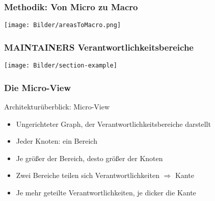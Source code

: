 \documentclass{beamer}
\begin{document}





	\begin{frame}
	\frametitle{Methodik: Von Micro zu Macro}
	\centering
	\texttt{[image: Bilder/areasToMacro.png]}
	\end{frame}

	\begin{frame}
	\frametitle{MAINTAINERS Verantwortlichkeitsbereiche}
	\texttt{[image: Bilder/section-example]}
	\end{frame}

	\begin{frame}
	\frametitle{Die Micro-View}
		\begin{block}{Architekturüberblick: Micro-View}
			\begin{itemize}
				\item Ungerichteter Graph, der Verantwortlichkeitsbereiche darstellt
				\item Jeder Knoten: ein Bereich
				\item Je größer der Bereich, desto größer der Knoten
				\item Zwei Bereiche teilen sich Verantwortlichkeiten $\Rightarrow$ Kante
				\item Je mehr geteilte Verantwortlichkeiten, je dicker die Kante
			\end{itemize}
		\end{block}
	\end{frame}
\end{document}
